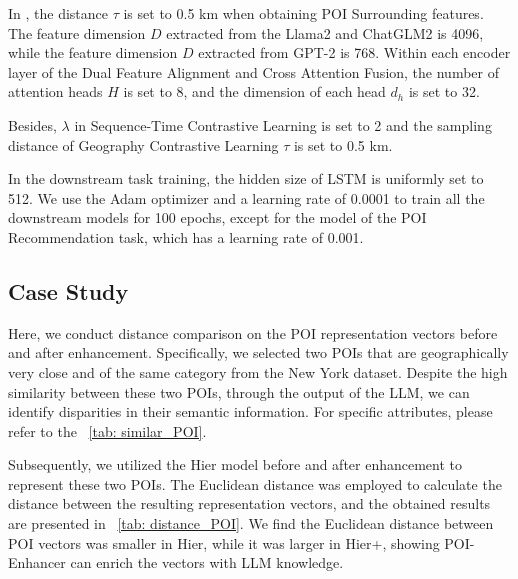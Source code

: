 
In \name, the distance $\tau$ is set to 0.5 km when obtaining POI Surrounding features. The feature dimension $D$ extracted from the Llama2 and ChatGLM2 is 4096, while the feature dimension $D$ extracted from GPT-2 is 768.
Within each encoder layer of the Dual Feature Alignment and Cross Attention Fusion, the number of attention heads $H$ is set to 8, and the dimension of each head $d_h$ is set to 32.


Besides,  $\lambda$ in Sequence-Time Contrastive Learning is set to 2 and the sampling distance of Geography Contrastive Learning $\tau$ is set to 0.5 km. 


 In the downstream task training, the hidden size of LSTM is uniformly set to 512. We use the Adam optimizer and a learning rate of 0.0001 to train all the downstream models for 100 epochs, except for the model of the POI Recommendation task, which has a learning rate of 0.001. 


 

\subsection{Case Study}
Here, we conduct distance comparison on the POI  representation vectors before and after enhancement. Specifically,  we selected two POIs that are geographically very close and of the same category from the New York dataset. Despite the high similarity between these two POIs, through the output of the LLM, we can identify disparities in their semantic information. For specific attributes, please refer to the \tableautorefname ~\ref{tab: similar_POI}.
    \begin{table}[ht]
    \centering
         \caption{The attributes of two similar POIs.} 
        \label{tab: similar_POI}
    \end{table}
Subsequently, we utilized the Hier model before and after enhancement to represent these two POIs. The Euclidean distance was employed to calculate the distance between the resulting representation vectors, and the obtained results are presented in \tableautorefname ~\ref{tab: distance_POI}. We find the Euclidean distance between POI vectors was smaller in Hier, while it was larger in Hier+, showing POI-Enhancer can enrich the vectors with LLM knowledge.

